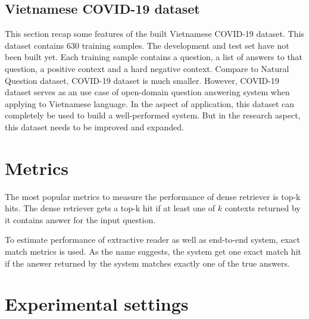 \documentclass[3p, sort&compress, 12pt]{elsarticle}
\begin{document}
\subsection{Vietnamese COVID-19 dataset}
This section recap some features of the built Vietnamese COVID-19 dataset. This dataset contains 630 training samples. The development and test set have not been built yet. Each training sample contains a question, a list of answers to that question, a positive context and a hard negative context. Compare to Natural Question dataset, COVID-19 dataset is much smaller. However, COVID-19 dataset serves as an use case of open-domain question answering system when applying to Vietnamese language. In the aspect of application, this dataset can completely be used to build a well-performed system. But in the research aspect, this dataset needs to be improved and expanded. 
\section{Metrics}
The most popular metrics to measure the performance of dense retriever is top-k hits. The dense retriever gets a top-k hit if at least one of $k$ contexts returned by it contains answer for the input question. 
\par To estimate performance of extractive reader as well as end-to-end system, exact match metrics is used. As the name suggests, the system get one exact match hit if the answer returned by the system matches exactly one of the true answers. 
\section{Experimental settings}
\end{document}
